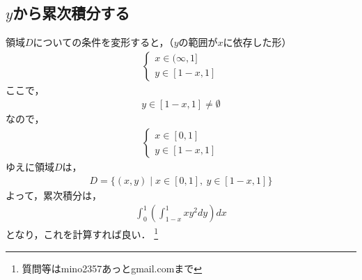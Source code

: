 \documentclass[12pt]{jarticle}
\begin{document}
\subsection{$y$から累次積分する}
領域$D$についての条件を変形すると，（$y$の範囲が$x$に依存した形）
\begin{align*}
\left\{
	\begin{array}{ll}
	x \in ( \infty, 1] \\
	y \in [1-x, 1]
	\end{array}
\right.
\end{align*}
ここで，
\begin{align*}
y \in [1-x,1] \neq \emptyset
\end{align*}
なので，
\begin{align*}
\left\{
	\begin{array}{ll}
	x \in [0, 1] \\
	y \in [1-x, 1]
	\end{array}
\right.
\end{align*}
ゆえに領域$D$は，
\begin{align*}
D = \{(x,y) \mid x \in [0,1],\ y \in [1-x,1] \} 
\end{align*}
よって，累次積分は，
\begin{align*}
\int_{0}^{1} \left( \int_{1-x}^{1} x y^{2} dy \right) dx
\end{align*}
となり，これを計算すれば良い．
\footnote[0]{
質問等はmino2357あっとgmail.comまで
}

\thispagestyle{empty}
\end{document}
